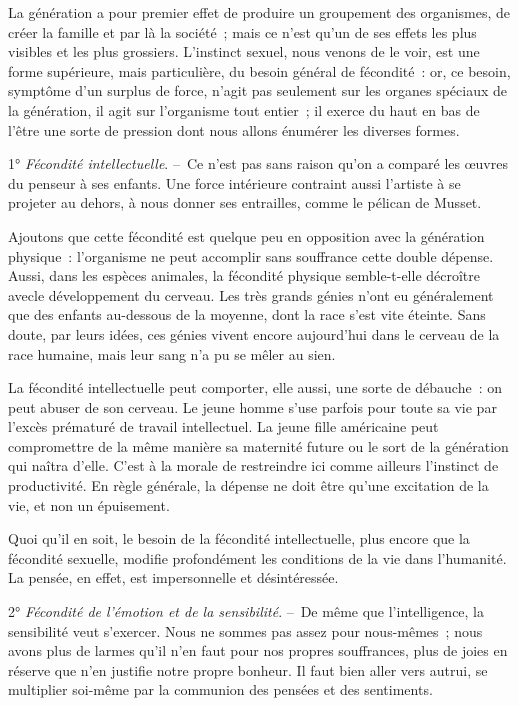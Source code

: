 \documentclass[french,twoside]{book} %
\begin{document}
La génération a pour premier effet de produire un groupement des organismes, de créer la famille et par là la société ; mais ce n’est qu’un de ses effets les plus visibles et les plus grossiers. L’instinct sexuel, nous venons de le voir, est une forme supérieure, mais particulière, du besoin général de fécondité : or, ce besoin, symptôme d’un surplus de force, n’agit pas seulement sur les organes spéciaux de la génération, il agit sur l’organisme tout entier ; il exerce du haut en bas de l’être une sorte de pression dont nous allons énumérer les diverses formes.\par
1° \emph{Fécondité intellectuelle}. – Ce n’est pas sans raison qu’on a comparé les œuvres du penseur à ses enfants. Une force intérieure contraint aussi l’artiste à se projeter au dehors, à nous donner ses entrailles, comme le pélican de Musset.\par
Ajoutons que cette fécondité est quelque peu en opposition avec la génération physique : l’organisme ne peut accomplir sans souffrance cette double dépense. Aussi, dans les espèces animales, la fécondité physique semble-t-elle décroître avecle développement du cerveau. Les très grands génies n’ont eu généralement que des enfants au-dessous de la moyenne, dont la race s’est vite éteinte. Sans doute, par leurs idées, ces génies vivent encore aujourd’hui dans le cerveau de la race humaine, mais leur sang n’a pu se mêler au sien.\par
La fécondité intellectuelle peut comporter, elle aussi, une sorte de débauche : on peut abuser de son cerveau. Le jeune homme s’use parfois pour toute sa vie par l’excès prématuré de travail intellectuel. La jeune fille américaine peut compromettre de la même manière sa maternité future ou le sort de la génération qui naîtra d’elle. C’est à la morale de restreindre ici comme ailleurs l’instinct de productivité. En règle générale, la dépense ne doit être qu’une excitation de la vie, et non un épuisement.\par
Quoi qu’il en soit, le besoin de la fécondité intellectuelle, plus encore que la fécondité sexuelle, modifie profondément les conditions de la vie dans l’humanité. La pensée, en effet, est impersonnelle et désintéressée.\par
2° \emph{Fécondité de l’émotion et de la sensibilité}. – De même que l’intelligence, la sensibilité veut s’exercer. Nous ne sommes pas assez pour nous-mêmes ; nous avons plus de larmes qu’il n’en faut pour nos propres souffrances, plus de joies en réserve que n’en justifie notre propre bonheur. Il faut bien aller vers autrui, se multiplier soi-même par la communion des pensées et des sentiments.\par
\end{document}
